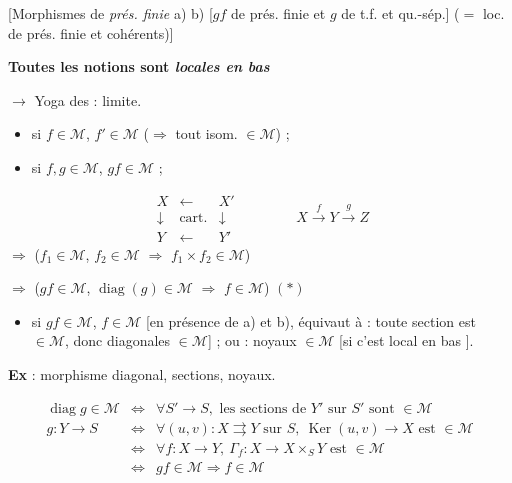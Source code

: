 \documentclass[11pt,a4paper]{article}
\begin{document}
[Morphismes de \emph{prés. finie} a) b) [$gf$ de prés. finie et $g$ de t.f. et qu.-sép.] ($=$ loc. de prés. finie et cohérents)]

\textbf{Toutes les notions sont \emph{locales en bas}}

$\to$ Yoga des \ill{} : \ill{} limite.


\begin{itemize}
  \item[a)] si $f \in \mathcal{M}$, $f' \in \mathcal{M}$ ($\Rightarrow$ tout isom. $\in \mathcal{M}$) ;
  \item[b)] si $f, g \in \mathcal{M}$, $gf \in \mathcal{M}$ ;
\end{itemize}

\[
\begin{array}{ccc} X & \longleftarrow & X' \\ \downarrow & \text{cart.} & \downarrow \\ Y & \longleftarrow & Y' \end{array}
\qquad\qquad X \xrightarrow{\ f\ } Y \xrightarrow{\ g\ } Z
\]
$\Longrightarrow$ ($f_1 \in \mathcal{M}$, $f_2 \in \mathcal{M}$ $\Rightarrow$ $f_1 \times f_2 \in \mathcal{M}$)

$\Longrightarrow$ ($gf \in \mathcal{M}$, $\operatorname{diag}(g) \in \mathcal{M}$ $\Rightarrow$ $f \in \mathcal{M}$) $(*)$

\begin{itemize}
  \item[c)] si $gf \in \mathcal{M}$, $f \in \mathcal{M}$ [en présence de a) et b), équivaut à : toute section est $\in \mathcal{M}$, donc diagonales $\in \mathcal{M}$] ; ou : noyaux $\in \mathcal{M}$ [si c'est local en bas  ].
\end{itemize}

\textbf{Ex} : morphisme diagonal, sections, noyaux.

\[
\begin{array}{lcl}
\operatorname{diag} g \in \mathcal{M} & \Longleftrightarrow & \forall S' \to S, \text{ les sections de } Y' \text{ sur } S' \text{ sont } \in \mathcal{M} \\
g : Y \to S & \Longleftrightarrow & \forall (u, v) : X \rightrightarrows Y \text{ sur } S,\ \operatorname{Ker}(u, v) \to X \text{ est } \in \mathcal{M} \\
 & \Longleftrightarrow & \forall f : X \to Y,\ \Gamma_f : X \to X \times_S Y \text{ est } \in \mathcal{M} \\
 & \Longleftrightarrow & gf \in \mathcal{M} \Rightarrow f \in \mathcal{M}
\end{array}
\]
\end{document}
